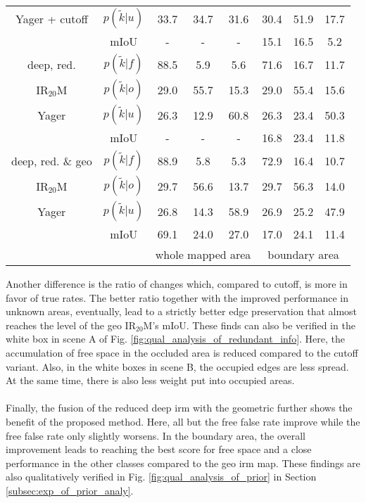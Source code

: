 \begin{center}
\begin{tabular}{c|c|ccc|ccc}
		Yager + cutoff&$p(\tilde{k}|u)$ & 33.7 & 34.7 & 31.6& 30.4 & 51.9 & 17.7 \\
		& mIoU & - & - & - &15.1&16.5&5.2 \\			
		\hline
		deep, red.&$p(\tilde{k}|f)$ & \textcolor{mygreen}{88.5} & \textcolor{myred}{5.9} & 5.6& \textcolor{mygreen}{71.6} & \textcolor{myred}{16.7} & 11.7 \\
		IR$_{20}$M&$p(\tilde{k}|o)$ & \textcolor{myred}{29.0} & \textcolor{mygreen}{55.7} & 15.3& \textcolor{myred}{29.0} & \textcolor{mygreen}{55.4} & 15.6 \\
		Yager&$p(\tilde{k}|u)$ & 26.3 & 12.9 & 60.8& 26.3 & 23.4 & 50.3 \\
		& mIoU & - & - & - &16.8&23.4&11.8 \\
		\hline
		deep, red. \& geo&$p(\tilde{k}|f)$ & \textcolor{mygreen}{88.9} & \textcolor{myred}{5.8} & 5.3& \textcolor{mygreen}{72.9} & \textcolor{myred}{16.4} & 10.7 \\
		IR$_{20}$M&$p(\tilde{k}|o)$ & \textcolor{myred}{29.7} & \textcolor{mygreen}{56.6} & 13.7& \textcolor{myred}{29.7} & \textcolor{mygreen}{56.3} & 14.0 \\
		Yager&$p(\tilde{k}|u)$ & 26.8 & 14.3 & 58.9& 26.9 & 25.2 & 47.9 \\
		& mIoU &69.1&24.0&27.0&17.0&24.1&11.4 \\
		\hline
		& & \multicolumn{3}{c|}{whole mapped area} & \multicolumn{3}{c}{boundary area}
	\end{tabular}
\end{center}
Another difference is the ratio of changes which, compared to cutoff, is more in favor of true rates. The better ratio together with the improved performance in unknown areas, eventually, lead to a strictly better edge preservation that almost reaches the level of the geo IR$_{20}$M's mIoU. These finds can also be verified in the white box in scene A of Fig. \ref{fig:qual_analysis_of_redundant_info}. Here, the accumulation of free space in the occluded area is reduced compared to the cutoff variant. Also, in the white boxes in scene B, the occupied edges are less spread. At the same time, there is also less weight put into occupied areas.
\\\\
Finally, the fusion of the reduced deep \gls{irm} with the geometric further shows the benefit of the proposed method. Here, all but the free false rate improve while the free false rate only slightly worsens. In the boundary area, the overall improvement leads to reaching the best score for free space and a close performance in the other classes compared to the geo \gls{irm} map. These findings are also qualitatively verified in Fig. \ref{fig:qual_analysis_of_prior} in Section \ref{subsec:exp_of_prior_analy}.
